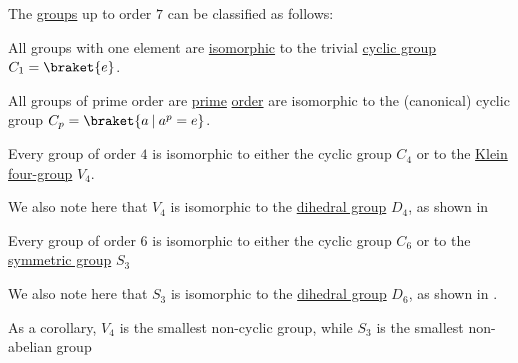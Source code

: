 \begin{proposition}\label{thm:clasification_of_small_groups}
  The \hyperref[def:group]{groups} up to order \( 7 \) can be classified as follows:
  \begin{thmenum}
     All groups with one element are \hyperref[def:group/homomorphism]{isomorphic} to the trivial \hyperref[def:cyclic_group]{cyclic group} \( C_1 = \braket{ e } \).

     All groups of prime order are \hyperref[def:prime_number]{prime} \hyperref[def:group_order]{order} are isomorphic to the (canonical) cyclic group \( C_p = \braket{ a \given a^p = e } \).

     Every group of order \( 4 \) is isomorphic to either the cyclic group \( C_4 \) or to the \hyperref[def:klein_four_group]{Klein four-group} \( V_4 \).

    We also note here that \( V_4 \) is isomorphic to the \hyperref[def:dihedral_group]{dihedral group} \( D_4 \), as shown in 

     Every group of order \( 6 \) is isomorphic to either the cyclic group \( C_6 \) or to the \hyperref[def:symmetric_group]{symmetric group} \( S_3 \)

    We also note here that \( S_3 \) is isomorphic to the \hyperref[def:dihedral_group]{dihedral group} \( D_6 \), as shown in .
  \end{thmenum}
\end{proposition}
\begin{comments}
  \item As a corollary, \( V_4 \) is the smallest non-cyclic group, while \( S_3 \) is the smallest non-abelian group
\end{comments}
